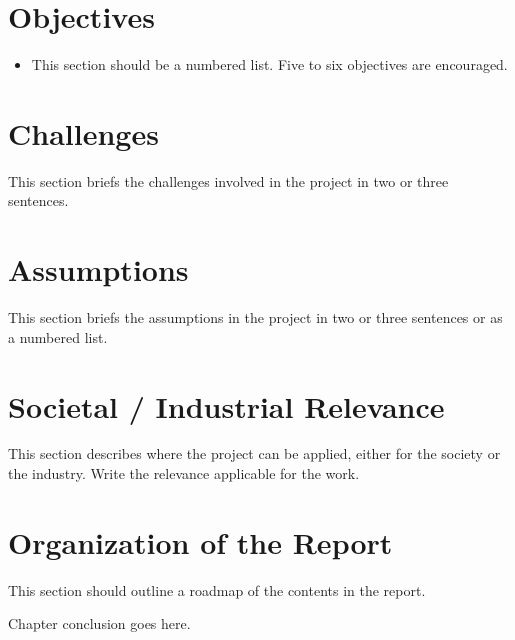	
	\section{Objectives}
	
	\begin{itemize}
		\item This section should be a numbered list. Five to six objectives are encouraged.
	\end{itemize}
	
	\section{Challenges}
	
	This section briefs the challenges involved in the project in two or three sentences.
	
	
	\section{Assumptions}
	
	This section briefs the assumptions in the project in two or three sentences or as a numbered list.
	
	
	\section{Societal / Industrial Relevance}
	
	This section describes where the project can be applied, either for the society or the industry. Write the relevance applicable for the work.
	
	\section{Organization of the Report}
	
	This section should outline a roadmap of the contents in the report.
	
\par 
Chapter conclusion goes here.